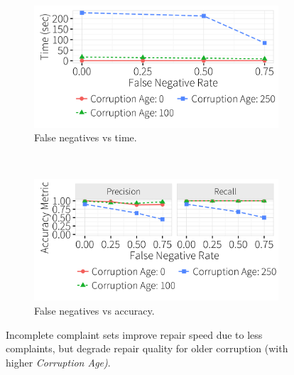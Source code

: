     
\begin{figure}[t]
  \hspace*{-.1in}
  \centering
    \begin{subfigure}[t]{.33\textwidth}
      \includegraphics[width = .99\columnwidth]{figures/noise_fn_time_fulllabel} 
      \vspace*{-.1in}
      \caption{False negatives vs time.}
      \label{f:falsenegative_time} 
    \end{subfigure}
    \\
    \begin{subfigure}[t]{.33\textwidth}
      \includegraphics[width = .99\columnwidth]{figures/noise_fn_acc_fulllabel}
      \vspace*{-.1in}
      \caption{False negatives vs accuracy.}
      \label{f:falsenegative_acc} 
    \end{subfigure}
    \vspace*{-.1in}
    \caption{Incomplete complaint sets improve repair speed due to less complaints, but degrade repair quality for older corruption (with higher \textit{Corruption Age)}. }
     \label{f:falsenegative} 
  \end{figure}



